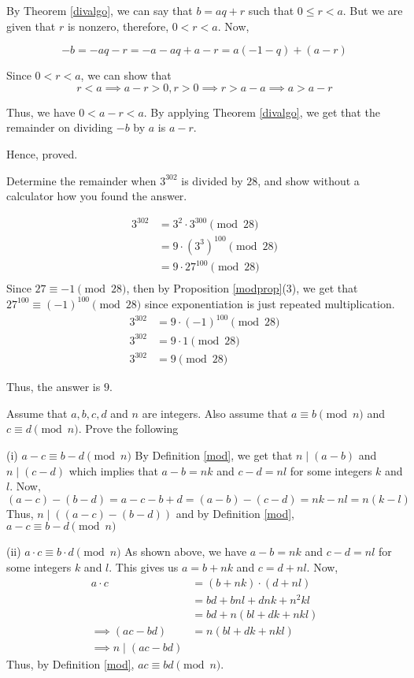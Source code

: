 \bs
	By Theorem \ref{divalgo}, we can say that $b = aq + r$ such that $0 \leq r < a$.
	But we are given that $r$ is nonzero, therefore, $0 < r < a$. Now,

	$$-b = -aq-r = -a-aq+a-r = a(-1-q) + (a-r)$$
	
	Since $0 < r < a$, we can show that 
	$$r < a \implies a - r > 0, r > 0 \implies r > a-a \implies a > a-r$$

	Thus, we have $0 < a-r < a$. By applying Theorem \ref{divalgo}, we get that the remainder on dividing $-b$ by $a$ is $a-r$.

	Hence, proved.

\es

\bp 
	Determine the remainder when $3^302$ is divided by $28$, and show without a calculator how you found the answer.
\ep 

\bs
	\begin{align}
		3^{302} &= 3^{2} \cdot 3^{300} \pmod{28} \\
						&= 9 \cdot (3^3)^{100}  \pmod{28} \\
						&= 9 \cdot 27^{100} \pmod{28} \\
	\end{align}
	Since $27 \equiv -1 \pmod{28}$, then by Proposition \ref{modprop}(3), we get that $27^{100} \equiv (-1)^{100} \pmod{28}$ since exponentiation is just repeated multiplication.
	\begin{align}
		3^{302} &= 9 \cdot (-1)^{100} \pmod{28} \\
		3^{302} &= 9 \cdot 1 \pmod{28} \\
		3^{302} &= 9 \pmod{28}
	\end{align}

	Thus, the answer is $9$.

\es

\bp 
	Assume that $a, b, c, d$ and $n$ are integers. Also assume that $a \equiv b \pmod{n}$ and $c \equiv d \pmod n$. Prove the following

	(i) $a-c \equiv b-d \pmod{n}$
	\bs
		By Definition \ref{mod}, we get that $n \mid (a-b)$ and $n \mid (c-d)$ which implies that $a-b = nk$ and $c-d = nl$ for some integers $k$ and $l$. Now,
		$$(a-c)-(b-d) = a-c-b+d = (a-b)-(c-d) = nk-nl = n(k-l)$$
		Thus, $n \mid ((a-c)-(b-d))$ and by Definition \ref{mod}, $a-c \equiv b-d \pmod{n}$
	\es

	(ii) $a \cdot c \equiv b \cdot d \pmod{n}$
	\bs
		As shown above, we have $a-b = nk$ and $c-d = nl$ for some integers $k$ and $l$. This gives us $a = b+nk$ and $c = d+nl$. Now,
		\begin{align}
			a \cdot c &= (b + nk) \cdot (d + nl) \\
								&= bd + bnl + dnk + n^2 kl \\
								&= bd + n(bl+dk+nkl) \\
			\implies (ac - bd) &= n(bl+dk+nkl) \\
			\implies n \mid (ac - bd)
		\end{align}
		Thus, by Definition \ref{mod}, $ac \equiv bd \pmod{n}$.
	\es
\ep 

